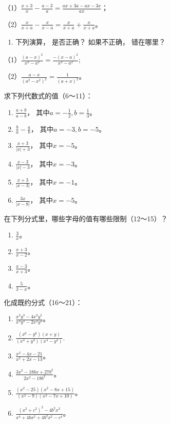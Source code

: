 （1）\(\frac{x + 3}{x} - \frac{a - 3}{a} = \frac{ax + 3a - ax - 3x}{ax}\)；

（2）\(\frac{x}{x + a} - \frac{x}{x - a} = \frac{x}{x + a} + \frac{x}{x + a}\)。

\begin{enumerate}[start=5]
\item
  下列演算， 是否正确？ 如果不正确， 错在哪里？
\end{enumerate}

（1）\(\frac{(a - x)^2}{x^2 - a^2} = \frac{-(x - a)^2}{x^2 - a^2};\)

（2）\(\frac{a - x}{(a^2 - x^2)^2} = \frac{1}{(a + x)^2}\)。

求下列代数式的值（6～11）：

\begin{enumerate}[start=6]
\item
  \(\frac{a + b}{a - b}\)， 其中\(a = -\frac{1}{2}, b = \frac{1}{3}\)。
\item
  \(\frac{b}{a} - \frac{a}{b}\)， 其中\(a = -3, b = -5\)。
\item
  \(\frac{x + 3}{|x| + 3}\)， 其中\(x = -5\)。
\item
  \(\frac{x - 3}{|x| - 3}\)， 其中\(x = -3\)。
\item
  \(\frac{x + 3}{|x - 3|}\)， 其中\(x = -1\)。
\item
  \(\frac{3x}{|x - 8|}\)， 其中\(x = -5\)。
\end{enumerate}

在下列分式里，哪些字母的值有哪些限制（12～15）？

\begin{enumerate}[start=12]
\item
  \(\frac{3}{x}\)。
\item
  \(\frac{x + 3}{x - 2}\)。
\item
  \(\frac{x - 3}{x + 3}\)。
\item
  \(\frac{5}{3 - x}\)。
\end{enumerate}

化成既约分式（16～21）：

\begin{enumerate}[start=16]
\item
  \(\frac{x^2y^3 - 4x^2y^5}{x^3y^3 - 2x^2y^3}\)。
\item
  \(\frac{(x^6 - y^6)(x + y)}{(x^3 + y^3)(x^4 - y^4)}.\)
\item
  \(\frac{x^2 - 4x - 21}{x^2 + 2x - 13}\)。
\item
  \(\frac{3x^2 - 18bx + 27b^2}{2x^2 - 18b^2}\)。
\item
  \(\frac{(x^2 - 25)(x^2 - 8x + 15)}{(x^2 - 9)(x^2 - 7x + 10)}\)。
\item
  \(\frac{(x^2 + c^2)^2 - 4b^2x^2}{x^4 + 4bx^2 + 4b^2x^2 - c^4}\)。
\end{enumerate}

